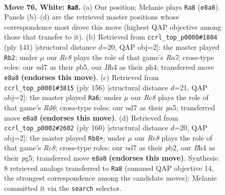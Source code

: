 \documentclass[11pt]{article}
\begin{document}
\clearpage

\begin{figure}[p]\centering
\begin{subfigure}{0.46\textwidth}\centering
\resizebox{\linewidth}{!}{%
\newchessgame
\chessboard[
  setfen={4R3/3n2k1/8/3r4/p4P1B/P6P/6K1/8 w - - 7 76},
  showmover=false,
  pgfstyle=straightmove, color=movearrow, markmove={e8-a8}
]}
\caption{}
\end{subfigure}\hfill
\begin{subfigure}{0.46\textwidth}\centering
\resizebox{\linewidth}{!}{%
\newchessgame
\chessboard[
  setfen={8/8/1p3kp1/1P1R4/7P/5Pp1/r7/6K1 b - - 1 71},
  showmover=false,
  pgfstyle=straightmove, color=movearrow, markmove={a2-b2}
]}
\caption{}
\end{subfigure}
\\[4pt]
\begin{subfigure}{0.46\textwidth}\centering
\resizebox{\linewidth}{!}{%
\newchessgame
\chessboard[
  setfen={8/5k2/3R4/p1r5/P7/4PK2/8/8 w - - 7 79},
  showmover=false,
  pgfstyle=straightmove, color=movearrow, markmove={d6-a6}
]}
\caption{}
\end{subfigure}\hfill
\begin{subfigure}{0.46\textwidth}\centering
\resizebox{\linewidth}{!}{%
\newchessgame
\chessboard[
  setfen={2R5/4r3/P6P/6p1/6P1/1k3K2/1p6/8 w - - 4 81},
  showmover=false,
  pgfstyle=straightmove, color=movearrow, markmove={c8-b8}
]}
\caption{}
\end{subfigure}
\caption{\textbf{Move 76, White: \texttt{Ra8}.} (a) Our position; Melanie plays \texttt{Ra8} (\texttt{e8a8}). Panels (b)--(d) are the retrieved master positions whose correspondence most drove this move (highest QAP objective among those that transfer to it). (b) Retrieved from \texttt{ccrl\_top\_p0000\#1804} (ply 141) [structural distance $d$=20, QAP obj=2]: the master played \texttt{Rb2}; under $\mu$ our \emph{Re8} plays the role of that game's \emph{Ra7}; cross-type roles: our \emph{n}d7 as their \emph{p}b5, our \emph{B}h4 as their \emph{p}h4; transferred move \texttt{e8a8} \textbf{(endorses this move)}. (c) Retrieved from \texttt{ccrl\_top\_p0001\#3815} (ply 156) [structural distance $d$=21, QAP obj=2]: the master played \texttt{Ra6}; under $\mu$ our \emph{Re8} plays the role of that game's \emph{Rd6}; cross-type roles: our \emph{n}d7 as their \emph{p}a5; transferred move \texttt{e8a8} \textbf{(endorses this move)}. (d) Retrieved from \texttt{ccrl\_top\_p0002\#2602} (ply 160) [structural distance $d$=20, QAP obj=2]: the master played \texttt{Rb8+}; under $\mu$ our \emph{Re8} plays the role of that game's \emph{Rc8}; cross-type roles: our \emph{n}d7 as their \emph{p}b2, our \emph{B}h4 as their \emph{p}g5; transferred move \texttt{e8a8} \textbf{(endorses this move)}. Synthesis: 8 retrieved analogs transferred to \texttt{Ra8} (summed QAP objective 14, the strongest correspondence among the candidate moves); Melanie committed it via the \texttt{search} selector.}
\label{fig:thought-m150}
\end{figure}
\end{document}
